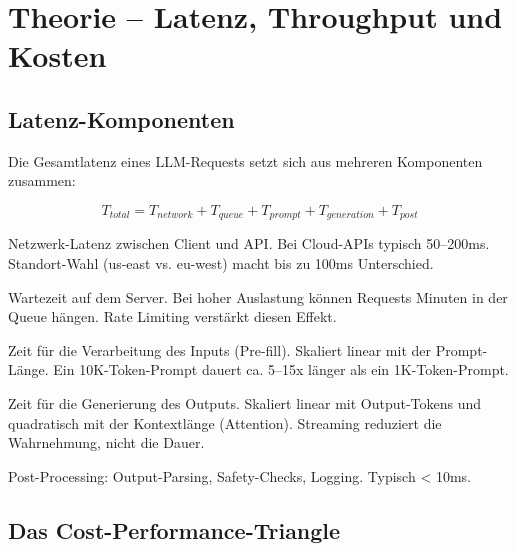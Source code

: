\section{Theorie -- Latenz, Throughput und Kosten}

\subsection{Latenz-Komponenten}

Die Gesamtlatenz eines LLM-Requests setzt sich aus mehreren Komponenten zusammen:

\begin{equation}
T_{total} = T_{network} + T_{queue} + T_{prompt} + T_{generation} + T_{post}
\end{equation}

\begin{description}[leftmargin=*,style=nextline]
    \item[$T_{network}$] Netzwerk-Latenz zwischen Client und API. Bei Cloud-APIs typisch 50--200ms. Standort-Wahl (us-east vs. eu-west) macht bis zu 100ms Unterschied.
    \item[$T_{queue}$] Wartezeit auf dem Server. Bei hoher Auslastung können Requests Minuten in der Queue hängen. Rate Limiting verstärkt diesen Effekt.
    \item[$T_{prompt}$] Zeit für die Verarbeitung des Inputs (Pre-fill). Skaliert linear mit der Prompt-Länge. Ein 10K-Token-Prompt dauert ca. 5--15x länger als ein 1K-Token-Prompt.
    \item[$T_{generation}$] Zeit für die Generierung des Outputs. Skaliert linear mit Output-Tokens und quadratisch mit der Kontextlänge (Attention). Streaming reduziert die Wahrnehmung, nicht die Dauer.
    \item[$T_{post}$] Post-Processing: Output-Parsing, Safety-Checks, Logging. Typisch < 10ms.
\end{description}

\subsection{Das Cost-Performance-Triangle}

